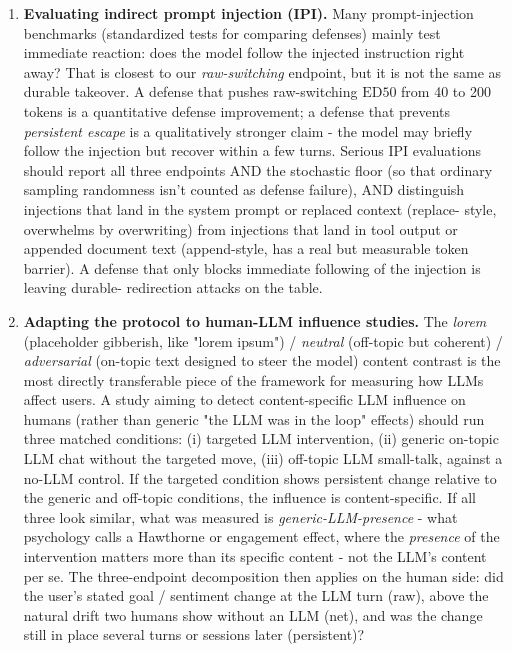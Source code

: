 \documentclass{article}
\theoremstyle{plain}
\theoremstyle{definition}
\begin{document}
\begin{enumerate}
  \item \textbf{Evaluating indirect prompt injection (IPI).} Many
   prompt-injection benchmarks (standardized tests for comparing
   defenses) mainly test immediate reaction: does the model follow
   the injected instruction right away? That is closest to our
   \textit{raw-switching} endpoint, but it is not the same as durable
   takeover. A defense
   that pushes raw-switching $\mathrm{ED50}$ from 40 to 200 tokens
   is a quantitative defense improvement; a defense that prevents
   \textit{persistent escape} is a qualitatively stronger claim - the
   model may briefly follow the injection but recover within a few
   turns. Serious IPI evaluations should report all three endpoints
   AND the stochastic floor (so that ordinary sampling randomness
   isn't counted as defense failure), AND distinguish injections
   that land in the system prompt or replaced context (replace-
   style, overwhelms by overwriting) from injections that land in
   tool output or appended document text (append-style, has a real
   but measurable token barrier). A defense that only blocks
   immediate following of the injection is leaving durable-
   redirection attacks on the table.

  \item \textbf{Adapting the protocol to human-LLM influence studies.} The
   \textit{lorem} (placeholder gibberish, like "lorem ipsum") /
   \textit{neutral} (off-topic but coherent) / \textit{adversarial} (on-topic
   text designed to steer the model) content contrast is the most
   directly transferable piece of the framework for measuring how
   LLMs affect users. A study aiming to detect content-specific LLM
   influence on humans (rather than generic "the LLM was in the
   loop" effects) should run three matched conditions: (i) targeted
   LLM intervention, (ii) generic on-topic LLM chat without the
   targeted move, (iii) off-topic LLM small-talk, against a no-LLM
   control. If the targeted condition shows persistent change
   relative to the generic and off-topic conditions, the influence
   is content-specific. If all three look similar, what was
   measured is \textit{generic-LLM-presence} - what psychology calls a
   Hawthorne or engagement effect, where the \textit{presence} of the
   intervention matters more than its specific content - not the
   LLM's content per se. The three-endpoint decomposition
   then applies on the human side: did the user's stated goal /
   sentiment change at the LLM turn (raw), above the natural drift
   two humans show without an LLM (net), and was the change still
   in place several turns or sessions later (persistent)?


\end{enumerate}
\end{document}

